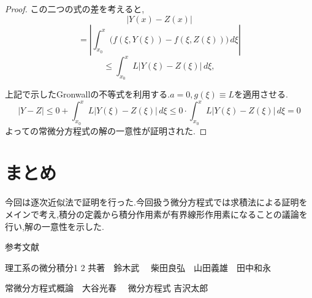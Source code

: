 \documentclass[12pt]{bxjsarticle}
\begin{document}
\begin{proof}
この二つの式の差を考えると,
\[
|Y(x) - Z(x)|
\]
\[
= \left| \displaystyle \int_{x_{0}}^{x} \big( f(\xi, Y(\xi)) - f(\xi, Z(\xi)) \big) \, d\xi \right|
\]
\[
\leq \displaystyle \int_{x_{0}}^{x} L |Y(\xi) - Z(\xi)| \, d\xi,
\]


上記で示したGronwallの不等式を利用する.$a=0,g(\xi)\equiv L$を適用させる.
\[\left|Y-Z \right|\leq 0+\displaystyle \int_{x_{0}}^{x} L |Y(\xi) - Z(\xi)| \, d\xi \leq 0\cdot \displaystyle \int_{x_{0}}^{x} L |Y(\xi) - Z(\xi)| \, d\xi =0\]
よっての常微分方程式の解の一意性が証明された.
\end{proof}

\section{まとめ}
\label{sec:まとめ}
今回は逐次近似法で証明を行った.今回扱う微分方程式では求積法による証明をメインで考え,積分の定義から積分作用素が有界線形作用素になることの議論を行い,解の一意性を示した.

参考文献

理工系の微分積分1 2 共著$\quad$鈴木武$\quad$ 柴田良弘$\quad$山田義雄$\quad$田中和永

常微分方程式概論$\quad$大谷光春  $\quad$微分方程式 吉沢太郎
\end{document}
